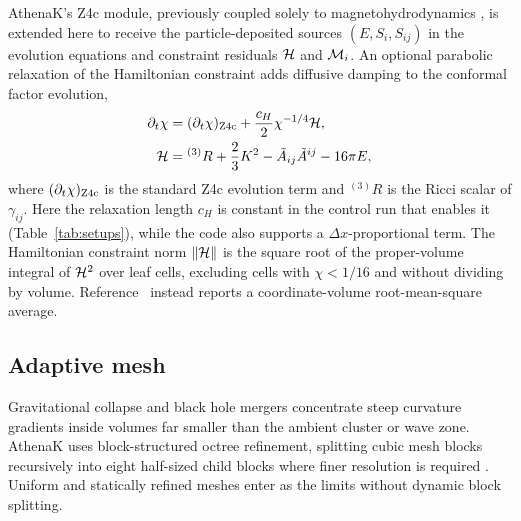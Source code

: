 AthenaK's Z4c module, previously coupled solely to magnetohydrodynamics \cite{Zhu:2024utz}, is extended here to receive the particle-deposited sources $(E, S_i, S_{ij})$ in the evolution equations and constraint residuals $\mathcal{H}$ and $\mathcal{M}_i$. An optional parabolic relaxation of the Hamiltonian constraint \cite{Duez:2002bn,Etienne:2024ncu,Wu:2026nrpic} adds diffusive damping to the conformal factor evolution,
\begin{align}\label{eq:parabolic_relaxation}
\partial_t \chi &= (\partial_t \chi)_{\rm Z4c} + \frac{c_H}{2}\chi^{-1/4}\mathcal{H}, \nonumber\\
\mathcal{H} &= {}^{(3)}R + \frac{2}{3}K^2 - \tilde{A}_{ij}\tilde{A}^{ij} - 16\pi E,
\end{align}
where $(\partial_t \chi)_{\rm Z4c}$ is the standard Z4c evolution term and ${}^{(3)}R$ is the Ricci scalar of $\gamma_{ij}$. Here the relaxation length $c_H$ is constant in the control run that enables it (Table~\ref{tab:setups}), while the code also supports a $\Delta x$-proportional term. The Hamiltonian constraint norm $\|\mathcal{H}\|$ is the square root of the proper-volume integral of $\mathcal{H}^2$ over leaf cells, excluding cells with $\chi < 1/16$ and without dividing by volume. Reference~\cite{Wu:2026nrpic} instead reports a coordinate-volume root-mean-square average.

\subsection{Adaptive mesh}\label{sec:amr}

Gravitational collapse and black hole mergers concentrate steep curvature gradients inside volumes far smaller than the ambient cluster or wave zone. AthenaK uses block-structured octree refinement, splitting cubic mesh blocks recursively into eight half-sized child blocks where finer resolution is required \cite{2020ApJS..249....4S,2026ApJS..283...27S}. Uniform and statically refined meshes enter as the limits without dynamic block splitting.

